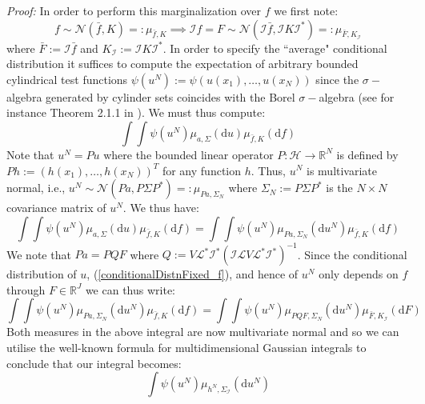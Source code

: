 \noindent \textit{Proof:}
In order to perform this marginalization over $f$ we first note:
\begin{equation}
    f\sim\mathcal{N}(\bar{f},K)=:\mu_{\bar{f},K} \implies \mathcal{I}f=F\sim\mathcal{N}(\mathcal{I}\bar{f},\mathcal{I}K\mathcal{I}^{*})=:\mu_{\bar{F},K_{\mathcal{I}}}
\end{equation}
where $\bar{F}:=\mathcal{I}\bar{f}$ and $K_{\mathcal{I}}:=\mathcal{I}K\mathcal{I}^{*}$. In order to specify the ``average" conditional distribution it suffices to compute the expectation of arbitrary bounded cylindrical test functions $\psi(u^{N}):=\psi(u(x_1),\dots,u(x_{N}))$ since the $\sigma-$algebra generated by cylinder sets coincides with the Borel $\sigma-$algebra (see for instance Theorem 2.1.1 in \textcolor{blue}{\citep{lunardi2015infinite}}). We must thus compute:
\begin{equation}
    \int\int\psi(u^{N})\mu_{a,\Sigma}(\mathrm{d}u)\mu_{\bar{f},K}(\mathrm{d}f)
\end{equation}
Note that $u^{N}=Pu$ where the bounded linear operator $P:\mathcal{H}\rightarrow\mathbb{R}^{N}$ is defined by $Ph:=(h(x_1),\dots,h(x_N))^T$ for any function $h$. Thus, $u^{N}$ is multivariate normal, i.e., $u^{N}\sim\mathcal{N}(Pa,P\Sigma P^{*})=:\mu_{Pa,\Sigma_{N}}$ where $\Sigma_{N}:=P\Sigma P^{*}$ is the $N\times N$ covariance matrix of $u^{N}$. We thus have:
\begin{equation}
    \int\int\psi(u^{N})\mu_{a,\Sigma}(\mathrm{d}u)\mu_{\bar{f},K}(\mathrm{d}f) = \int\int\psi(u^{N})\mu_{Pa,\Sigma_N}(\mathrm{d}u^{N})\mu_{\bar{f},K}(\mathrm{d}f)
\end{equation}
We note that $Pa=PQF$ where $Q:= V\mathcal{L}^{*}\mathcal{I}^{*}(\mathcal{I}\mathcal{L}V\mathcal{L}^{*}\mathcal{I}^{*})^{-1}$. Since the conditional distribution of $u$, (\ref{conditionalDistnFixed_f}), and hence of $u^{N}$ only depends on $f$ through $F\in\mathbb{R}^{J}$ we can thus write:
\begin{equation}
    \int\int\psi(u^{N})\mu_{Pa,\Sigma_N}(\mathrm{d}u^{N})\mu_{\bar{f},K}(\mathrm{d}f)=\int\int\psi(u^{N})\mu_{PQF,\Sigma_N}(\mathrm{d}u^{N})\mu_{\bar{F},K_{\mathcal{I}}}(\mathrm{d}F)
\end{equation}
Both measures in the above integral are now multivariate normal and so we can utilise the well-known formula for multidimensional Gaussian integrals to conclude that our integral becomes:
\begin{equation}
    \label{psi_integral_one}
    \int\psi(u^{N})\mu_{h^{N},\Sigma_{\mathcal{I}}}(\mathrm{d}u^{N})
\end{equation}
